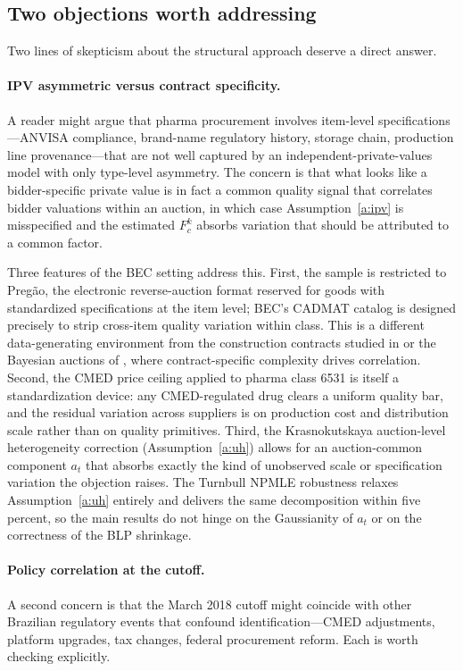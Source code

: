 \subsection{Two objections worth addressing}

Two lines of skepticism about the structural approach deserve a direct answer.

\paragraph{IPV asymmetric versus contract specificity.} A reader might argue that pharma procurement involves item-level specifications---ANVISA compliance, brand-name regulatory history, storage chain, production line provenance---that are not well captured by an independent-private-values model with only type-level asymmetry. The concern is that what looks like a bidder-specific private value is in fact a common quality signal that correlates bidder valuations within an auction, in which case Assumption~\ref{a:ipv} is misspecified and the estimated $F_c^k$ absorbs variation that should be attributed to a common factor.

Three features of the BEC setting address this. First, the sample is restricted to Preg\~ao, the electronic reverse-auction format reserved for goods with standardized specifications at the item level; BEC's CADMAT catalog is designed precisely to strip cross-item quality variation within class. This is a different data-generating environment from the construction contracts studied in \citet{bajari2014} or the Bayesian auctions of \citet{hendricks2003}, where contract-specific complexity drives correlation. Second, the CMED price ceiling applied to pharma class 6531 is itself a standardization device: any CMED-regulated drug clears a uniform quality bar, and the residual variation across suppliers is on production cost and distribution scale rather than on quality primitives. Third, the Krasnokutskaya auction-level heterogeneity correction (Assumption~\ref{a:uh}) allows for an auction-common component $a_t$ that absorbs exactly the kind of unobserved scale or specification variation the objection raises. The Turnbull NPMLE robustness relaxes Assumption~\ref{a:uh} entirely and delivers the same decomposition within five percent, so the main results do not hinge on the Gaussianity of $a_t$ or on the correctness of the BLP shrinkage.

\paragraph{Policy correlation at the cutoff.} A second concern is that the March 2018 cutoff might coincide with other Brazilian regulatory events that confound identification---CMED adjustments, platform upgrades, tax changes, federal procurement reform. Each is worth checking explicitly.

